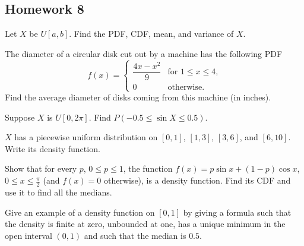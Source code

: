 \subsection{Homework 8}
\begin{problem}[Handout 12, \# 2]
  Let \(X\) be \(U[a,b]\). Find the PDF, CDF, mean, and variance of \(X\).
\end{problem}
\begin{solution*}
\end{solution*}

\begin{problem}[Handout 12, \# 8]
  The diameter of a circular disk cut out by a machine has the following
  PDF
  \[
    f(x)=%
    \begin{cases}
      \dfrac{4x-x^2}{9}&\text{for \(1\leq x\leq 4\),}\\
      0&\text{otherwise.}
    \end{cases}
  \]
  Find the average diameter of disks coming from this machine (in inches).
\end{problem}
\begin{solution*}
\end{solution*}

\begin{problem}[Handout 12, \# 9]
  Suppose \(X\) is \(U[0,2 \pi]\). Find \(P(-0.5\leq \sin X\leq 0.5)\).
\end{problem}
\begin{solution*}
\end{solution*}

\begin{problem}[Handout 12, \# 13]
  \(X\) has a piecewise uniform distribution on \([0,1]\), \([1,3]\),
  \([3,6]\), and \([6,10]\). Write its density function.
\end{problem}
\begin{solution*}
\end{solution*}

\begin{problem}[Handout 12, \# 16]
  Show that for every \(p\), \(0\leq p\leq 1\), the function
  \(f(x)=p\sin x+(1-p)\cos x\), \(0\leq x\leq\frac{\pi}{2}\) (and
  \(f(x)=0\) otherwise), is a density function. Find its CDF and use it to
  find all the medians.
\end{problem}
\begin{solution*}
\end{solution*}

\begin{problem}[Handout 12, \# 17]
  Give an example of a density function on \([0,1]\) by giving a formula
  such that the density is finite at zero, unbounded at one, has a unique
  minimum in the open interval \((0,1)\) and such that the median is
  \(0.5\).
\end{problem}
\begin{solution*}
\end{solution*}

